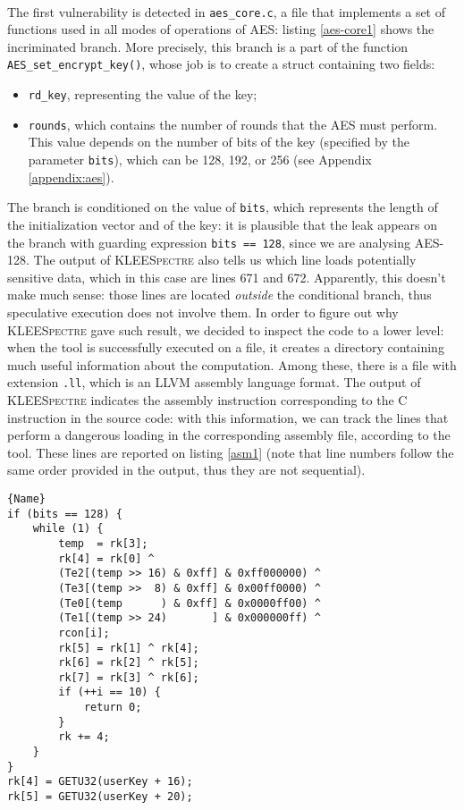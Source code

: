 \documentclass[target=mst,aauheader=aics]{thud}
\theoremstyle{definition}
\begin{document}
	\paragraph{} The first vulnerability is detected in \texttt{aes\_core.c}, a file that implements a set of functions used in all modes of operations of AES: listing \ref{aes-core1} shows the incriminated branch. More precisely, this branch is a part of the function \texttt{AES\_set\_encrypt\_key()}, whose job is to create a struct containing two fields:
	\begin{itemize}
		\item \texttt{rd\_key}, representing the value of the key;
		\item \texttt{rounds}, which contains the number of rounds that the AES must perform. This value depends on the number of bits of the key (specified by the parameter \texttt{bits}), which can be 128, 192, or 256 (see Appendix \ref{appendix:aes}). 
	\end{itemize}
	The branch is conditioned on the value of \texttt{bits}, which represents the length of the initialization vector and of the key: it is plausible that the leak appears on the branch with guarding expression \texttt{bits == 128}, since we are analysing AES-128. The output of \textsc{KLEESpectre} also tells us which line loads potentially sensitive data, which in this case are lines 671 and 672. Apparently, this doesn't make much sense: those lines are located \textit{outside} the conditional branch, thus speculative execution does not involve them. In order to figure out why \textsc{KLEESpectre} gave such result, we decided to inspect the code to a lower level: when the tool is successfully executed on a file, it creates a directory containing much useful information about the computation. Among these, there is a file with extension \texttt{.ll}, which is an LLVM assembly language format. The output of \textsc{KLEESpectre} indicates the assembly instruction corresponding to the C instruction in the source code: with this information, we can track the lines that perform a dangerous loading in the corresponding assembly file, according to the tool. These lines are reported on listing \ref{asm1} (note that line numbers follow the same order provided in the output, thus they are not sequential).

	\begin{minipage}{.75\textwidth}
		\begin{lstlisting}[caption=\texttt{aes\_core.c}, firstnumber=653, label=aes-core1]{Name}
if (bits == 128) {
	while (1) {
		temp  = rk[3];
		rk[4] = rk[0] ^
		(Te2[(temp >> 16) & 0xff] & 0xff000000) ^
		(Te3[(temp >>  8) & 0xff] & 0x00ff0000) ^
		(Te0[(temp      ) & 0xff] & 0x0000ff00) ^
		(Te1[(temp >> 24)       ] & 0x000000ff) ^
		rcon[i];
		rk[5] = rk[1] ^ rk[4];
		rk[6] = rk[2] ^ rk[5];
		rk[7] = rk[3] ^ rk[6];
		if (++i == 10) {
			return 0;
		}
		rk += 4;
	}
}
rk[4] = GETU32(userKey + 16);
rk[5] = GETU32(userKey + 20);
		\end{lstlisting}
	\end{minipage}
	\vspace{3mm}
    	
\end{document}
